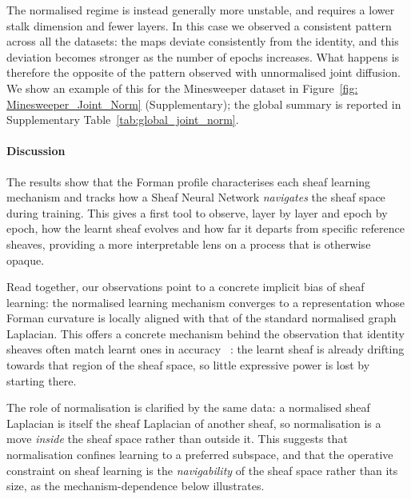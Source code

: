 

The normalised regime is instead generally more unstable, and requires a lower stalk dimension and fewer layers.
In this case we observed a consistent pattern across all the datasets: the maps deviate consistently from the identity, and this deviation becomes stronger as the number of epochs increases.
What happens is therefore the opposite of the pattern observed with unnormalised joint diffusion.
We show an example of this for the Minesweeper dataset in Figure~\ref{fig: Minesweeper_Joint_Norm} (Supplementary); the global summary is reported in Supplementary Table~\ref{tab:global_joint_norm}.

\paragraph{Discussion}

The results show that the Forman profile characterises each sheaf learning
mechanism and tracks how a Sheaf Neural Network \emph{navigates} the sheaf
space during training. This gives a first tool to observe, layer by layer and
epoch by epoch, how the learnt sheaf evolves and how far it departs from
specific reference sheaves, providing a more interpretable lens on a process
that is otherwise opaque.

Read together, our observations point to a concrete implicit bias of sheaf
learning: the normalised learning mechanism converges to a representation
whose Forman curvature is locally aligned with that of the standard
normalised graph Laplacian. This offers a concrete mechanism behind the
observation that identity sheaves often match learnt ones in accuracy
~\cite{caralt2026necessitylearnablesheaflaplacians}: the learnt sheaf is already drifting
towards that region of the sheaf space, so little expressive power is lost by
starting there.

The role of normalisation is clarified by the same data: a normalised sheaf
Laplacian is itself the sheaf Laplacian of another sheaf, so normalisation is
a move \emph{inside} the sheaf space rather than outside it. This suggests
that normalisation confines learning to a preferred subspace, and that the
operative constraint on sheaf learning is the \emph{navigability} of the
sheaf space rather than its size, as the mechanism-dependence below
illustrates.

